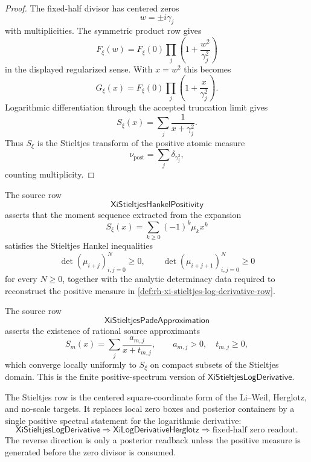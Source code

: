 \begin{proof}
The fixed-half divisor has centered zeros
$$
w=\pm i\gamma_j
$$
with multiplicities.  The symmetric product row gives
$$
F_\xi(w)
=
F_\xi(0)
\prod_j
\left(1+\frac{w^2}{\gamma_j^2}\right)
$$
in the displayed regularized sense.  With $x=w^2$ this becomes
$$
G_\xi(x)
=
F_\xi(0)
\prod_j
\left(1+\frac{x}{\gamma_j^2}\right).
$$
Logarithmic differentiation through the accepted truncation limit gives
$$
S_\xi(x)
=
\sum_j\frac{1}{x+\gamma_j^2}.
$$
Thus $S_\xi$ is the Stieltjes transform of the positive atomic measure
$$
\nu_{\mathrm{post}}
=
\sum_j\delta_{\gamma_j^2},
$$
counting multiplicity.
\end{proof}

\begin{definition}
\label{def:rh-stieltjes-hankel-positivity-target}
The source row
$$
\mathsf{XiStieltjesHankelPositivity}
$$
asserts that the moment sequence extracted from the expansion
$$
S_\xi(x)
=
\sum_{k\ge0}(-1)^k\mu_kx^k
$$
satisfies the Stieltjes Hankel inequalities
$$
\det(\mu_{i+j})_{i,j=0}^{N}\ge0,
\qquad
\det(\mu_{i+j+1})_{i,j=0}^{N}\ge0
$$
for every $N\ge0$, together with the analytic determinacy data required
to reconstruct the positive measure in
\autoref{def:rh-xi-stieltjes-log-derivative-row}.
\end{definition}

\begin{definition}
\label{def:rh-stieltjes-pade-approximation-target}
The source row
$$
\mathsf{XiStieltjesPadeApproximation}
$$
asserts the existence of rational source approximants
$$
S_m(x)
=
\sum_j\frac{a_{m,j}}{x+t_{m,j}},
\qquad
a_{m,j}>0,\quad t_{m,j}\ge0,
$$
which converge locally uniformly to $S_\xi$ on compact subsets of the
Stieltjes domain.  This is the finite positive-spectrum version of
$\mathsf{XiStieltjesLogDerivative}$.
\end{definition}

\begin{principle}
\label{prin:rh-stieltjes-row-compressed-source-target}
The Stieltjes row is the centered square-coordinate form of the
Li--Weil, Herglotz, and no-scale targets.  It replaces local zero boxes
and posterior containers by a single positive spectral statement for
the logarithmic derivative:
$$
\mathsf{XiStieltjesLogDerivative}
\Longrightarrow
\mathsf{XiLogDerivativeHerglotz}
\Longrightarrow
\text{fixed-half zero readout}.
$$
The reverse direction is only a posterior readback unless the positive
measure is generated before the zero divisor is consumed.
\end{principle}
